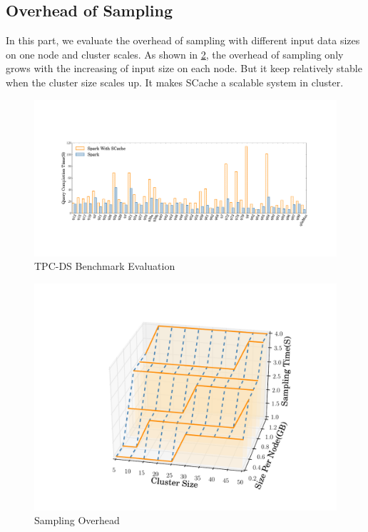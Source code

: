 \subsection{Overhead of Sampling}
In this part, we evaluate the overhead of sampling with different input data sizes on one node and cluster scales. As shown in \ref{fig:sampling}, the overhead of sampling only grows with the increasing of input size on each node. But it keep relatively stable when the cluster size scales up. It makes SCache a scalable system in cluster.
\begin{figure}
	\includegraphics[width=\textwidth]{fig/tpcds}
	\caption{TPC-DS Benchmark Evaluation}
	\label{fig:tpcds}
\end{figure}
\begin{figure}
	\centering
	\includegraphics[width=0.9\linewidth]{fig/sampling}
	\caption{Sampling Overhead}
	\label{fig:sampling}
\end{figure}

